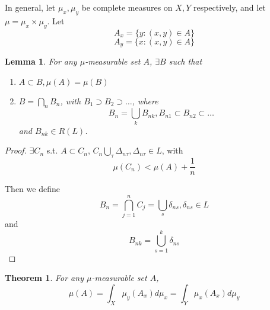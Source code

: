 \documentclass[11pt,a4paper]{report}
\newtheorem{lemma}[theorem]{Lemma}
\theoremstyle{plain}
\newtheorem{thm}{Theorem}[section]
\theoremstyle{definition}
\theoremstyle{remark}
\newcommand{\Union}{\bigcup}
\newcommand{\Intersection}{\bigcap}
\begin{document}
In general, let $\mu_x, \mu_y$ be complete measures on $X, Y$ respectively, and let $\mu = \mu_x \times \mu_y$. Let
$$ A_x = \{ y : (x, y) \in A \} $$
$$ A_y = \{ x : (x, y) \in A \} $$

\begin{lemma}
  For any $\mu$-measurable set $A$, $\exists B$ such that
  \begin{enumerate}
     \item $A \subset B, \mu(A) = \mu(B)$
     \item $ B = \Intersection_n B_n$, with $B_1 \supset B_2 \supset \dots$, where
         $$ B_n = \Union_k B_{nk}, B_{n1} \subset B_{n2} \subset \dots $$
        and $B_{nk} \in R(L)$.
  \end{enumerate}
\end{lemma}

\begin{proof}
    $\exists C_n$ s.t. $A \subset C_n$, $C_n \Union_{\tau} \Delta_{n\tau}, \Delta_{n\tau} \in L$, with 
    $$\mu(C_n) < \mu(A) + \frac{1}{n}$$

    Then we define 
    $$ B_n = \Intersection_{j=1}^n C_j = \Union_s \delta_{ns}, \delta_{ns} \in L $$
    and
    $$ B_{nk} = \Union_{s=1}^k \delta_{ns} $$
\end{proof}

\begin{thm}
  For any $\mu$-measurable set $A$,
  $$ \mu(A) = \int_X \mu_y(A_x) d \mu_x = \int_Y \mu_x(A_x) d\mu_y $$
\end{thm}
\end{document}
